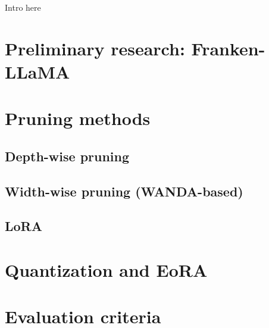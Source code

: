 Intro here

\section{Preliminary research: Franken-LLaMA}
\section{Pruning methods}
\subsection{Depth-wise pruning}
\subsection{Width-wise pruning (WANDA-based)}
\subsection{LoRA}
\section{Quantization and EoRA}
\section{Evaluation criteria}